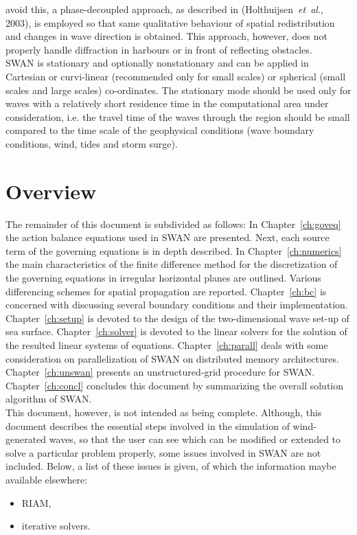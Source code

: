\documentclass[12pt]{book}
\begin{document}
avoid this, a phase-decoupled approach, as described in (Holthuijsen~{\it et~al}., 2003),
is employed so that same qualitative behaviour of spatial redistribution and changes in wave direction is
obtained. This approach, however, does not properly handle diffraction in harbours
or in front of reflecting obstacles.
\nocite{Hol03HB}
\\[2ex]
\noindent
SWAN is stationary and optionally nonstationary and can be applied in Cartesian or curvi-linear
(recommended only for small scales) or spherical (small scales and large scales) co-ordinates. The
stationary mode should be used only for waves with a relatively short residence time in the computational
area under consideration, i.e. the travel time of the waves through the region should be small compared
to the time scale of the geophysical conditions (wave boundary conditions, wind, tides and storm surge).

\section{Overview} \label{sec:overv}

The remainder of this document is subdivided as follows: In Chapter~\ref{ch:goveq} the action balance equations
used in SWAN are presented. Next, each source term of the governing equations is in depth described.
In Chapter~\ref{ch:numerics} the main characteristics of the finite difference method for the discretization
of the governing equations in irregular horizontal planes are outlined. Various differencing schemes for spatial
propagation are reported. Chapter~\ref{ch:bc} is concerned with discussing several boundary conditions and their
implementation.
Chapter~\ref{ch:setup} is devoted to the design of the two-dimensional wave set-up of sea surface.
Chapter~\ref{ch:solver} is devoted to the linear solvers for the solution of the resulted linear
systems of equations.
Chapter~\ref{ch:parall} deals with some consideration on parallelization of SWAN on
distributed memory architectures.
Chapter~\ref{ch:unswan} presents an unstructured-grid procedure for SWAN.
Chapter~\ref{ch:concl} concludes this document by summarizing the overall solution algorithm of SWAN.
\\[2ex]
\noindent
This document, however, is not intended as being complete. Although, this document describes the essential steps
involved in the simulation of wind-generated waves, so that the user can see which can be modified or extended to solve
a particular problem properly, some issues involved in SWAN are not included. Below, a list of these issues is
given, of which the information maybe available elsewhere:
\begin{itemize}
  \item RIAM,
  \item iterative solvers.
\end{itemize}
\end{document}
